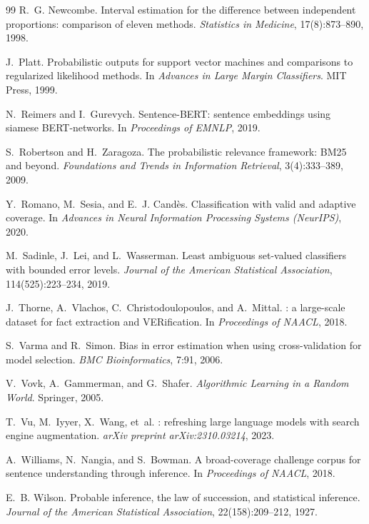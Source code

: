 \begin{thebibliography}{99}
R.~G. Newcombe.
\newblock Interval estimation for the difference between independent proportions: comparison of eleven methods.
\newblock \emph{Statistics in Medicine}, 17(8):873--890, 1998.

J.~Platt.
\newblock Probabilistic outputs for support vector machines and comparisons to regularized likelihood methods.
\newblock In \emph{Advances in Large Margin Classifiers}. MIT Press, 1999.

N.~Reimers and I.~Gurevych.
\newblock Sentence-{BERT}: sentence embeddings using siamese {BERT}-networks.
\newblock In \emph{Proceedings of EMNLP}, 2019.

S.~Robertson and H.~Zaragoza.
\newblock The probabilistic relevance framework: {BM25} and beyond.
\newblock \emph{Foundations and Trends in Information Retrieval}, 3(4):333--389, 2009.

Y.~Romano, M.~Sesia, and E.~J. Cand{\`e}s.
\newblock Classification with valid and adaptive coverage.
\newblock In \emph{Advances in Neural Information Processing Systems (NeurIPS)}, 2020.

M.~Sadinle, J.~Lei, and L.~Wasserman.
\newblock Least ambiguous set-valued classifiers with bounded error levels.
\newblock \emph{Journal of the American Statistical Association}, 114(525):223--234, 2019.

J.~Thorne, A.~Vlachos, C.~Christodoulopoulos, and A.~Mittal.
: a large-scale dataset for fact extraction and {VER}ification.
\newblock In \emph{Proceedings of NAACL}, 2018.

S.~Varma and R.~Simon.
\newblock Bias in error estimation when using cross-validation for model selection.
\newblock \emph{BMC Bioinformatics}, 7:91, 2006.

V.~Vovk, A.~Gammerman, and G.~Shafer.
\newblock \emph{Algorithmic Learning in a Random World}.
\newblock Springer, 2005.

T.~Vu, M.~Iyyer, X.~Wang, et~al.
: refreshing large language models with search engine augmentation.
\newblock \emph{arXiv preprint arXiv:2310.03214}, 2023.

A.~Williams, N.~Nangia, and S.~Bowman.
\newblock A broad-coverage challenge corpus for sentence understanding through inference.
\newblock In \emph{Proceedings of NAACL}, 2018.

E.~B. Wilson.
\newblock Probable inference, the law of succession, and statistical inference.
\newblock \emph{Journal of the American Statistical Association}, 22(158):209--212, 1927.

\end{thebibliography}
